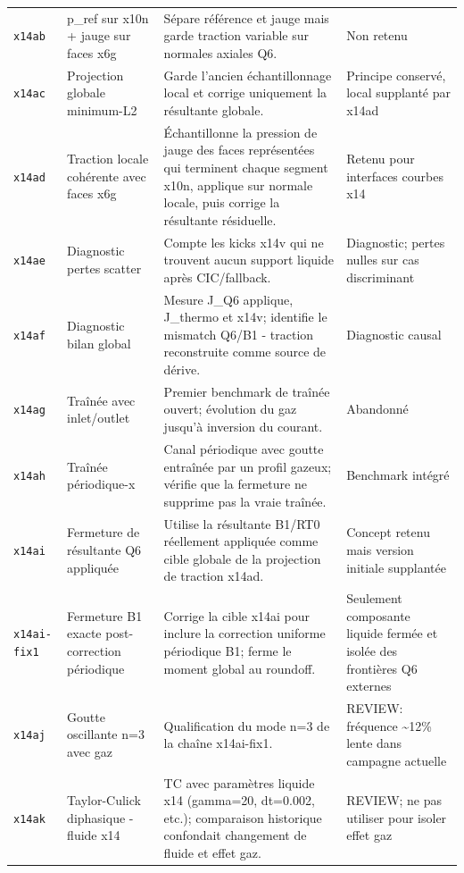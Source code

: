 \documentclass[a4paper,9pt]{article}
\begin{document}
\begin{landscape}
\begin{longtable}{L{2.35cm} L{5.3cm} L{13.25cm} L{4.75cm}}
\texttt{x14ab} & p\_ref sur x10n + jauge sur faces x6g & Sépare référence et jauge mais garde traction variable sur normales axiales Q6. & Non retenu \\
\texttt{x14ac} & Projection globale minimum-L2 & Garde l'ancien échantillonnage local et corrige uniquement la résultante globale. & Principe conservé, local supplanté par x14ad \\
\texttt{x14ad} & Traction locale cohérente avec faces x6g & Échantillonne la pression de jauge des faces représentées qui terminent chaque segment x10n, applique sur normale locale, puis corrige la résultante résiduelle. & Retenu pour interfaces courbes x14 \\
\texttt{x14ae} & Diagnostic pertes scatter & Compte les kicks x14v qui ne trouvent aucun support liquide après CIC/fallback. & Diagnostic; pertes nulles sur cas discriminant \\
\texttt{x14af} & Diagnostic bilan global & Mesure J\_Q6 applique, J\_thermo et x14v; identifie le mismatch Q6/B1 - traction reconstruite comme source de dérive. & Diagnostic causal \\
\texttt{x14ag} & Traînée avec inlet/outlet & Premier benchmark de traînée ouvert; évolution du gaz jusqu'à inversion du courant. & Abandonné \\
\texttt{x14ah} & Traînée périodique-x & Canal périodique avec goutte entraînée par un profil gazeux; vérifie que la fermeture ne supprime pas la vraie traînée. & Benchmark intégré \\
\texttt{x14ai} & Fermeture de résultante Q6 appliquée & Utilise la résultante B1/RT0 réellement appliquée comme cible globale de la projection de traction x14ad. & Concept retenu mais version initiale supplantée \\
\texttt{x14ai-fix1} & Fermeture B1 exacte post-correction périodique & Corrige la cible x14ai pour inclure la correction uniforme périodique B1; ferme le moment global au roundoff. & Seulement composante liquide fermée et isolée des frontières Q6 externes \\
\texttt{x14aj} & Goutte oscillante n=3 avec gaz & Qualification du mode n=3 de la chaîne x14ai-fix1. & REVIEW: fréquence \textasciitilde{}12\% lente dans campagne actuelle \\
\texttt{x14ak} & Taylor-Culick diphasique - fluide x14 & TC avec paramètres liquide x14 (gamma=20, dt=0.002, etc.); comparaison historique confondait changement de fluide et effet gaz. & REVIEW; ne pas utiliser pour isoler effet gaz \\

\end{longtable}
\end{landscape}
\end{document}
